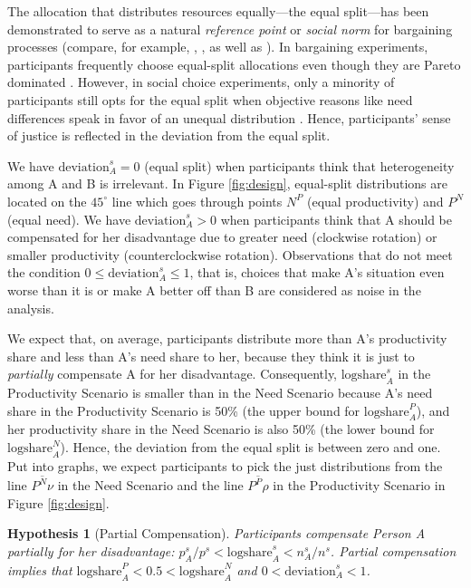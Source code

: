 \documentclass[smallcondensed]{svjour3}
\newtheorem{Hypothesis}{Hypothesis}
\begin{document}
%
The allocation that distributes resources equally---the equal split---has been demonstrated to serve as a natural \textit{reference point} or \textit{social norm} for
bargaining processes (compare, for example, \citealt{yaari_dividing_1984}, \citealt{dawid_robust_2006}, as well as \citealt{andreoni_social_2009}). In bargaining experiments, participants frequently choose equal-split allocations even though they are Pareto dominated \citep{herreiner_inequality_2010}. However, in social choice experiments, only a minority of participants still opts for the equal split when objective reasons like need differences speak in favor of an unequal distribution \citep{gaertner_empirical_2012}. Hence, participants' sense of justice is reflected in the deviation from the equal split.\par
%
We have $\mbox{deviation}_A^s=0$ (equal split) when participants think that heterogeneity among A and B is irrelevant. In Figure \ref{fig:design}, equal-split distributions are located on the $45^\circ$ line which goes through points $N^P$ (equal productivity) and $P^N$ (equal need). We have $\mbox{deviation}_A^s>0$ when participants think that A should be compensated for her disadvantage due to greater need (clockwise rotation) or smaller productivity (counterclockwise rotation). Observations that do not meet the condition $0\le\mbox{deviation}_A^s\le1$, that is, choices that make A's situation even worse than it is or make A better off than B are considered as noise in the analysis.\par
%
We expect that, on average, participants distribute more than A's productivity share and less than A's need share to her, because they think it is just to \textit{partially} compensate A for her disadvantage. Consequently, $\mbox{logshare}_A^s$ in the Productivity Scenario is smaller than in the Need Scenario because A's need share in the Productivity Scenario is 50\% (the upper bound for $\mbox{logshare}_A^P$), and her productivity share in the Need Scenario is also 50\% (the lower bound for $\mbox{logshare}_A^N$). Hence, the deviation from the equal split is between zero and one. Put into graphs, we expect participants to pick the just distributions from the line $\overline{P^N\nu}$ in the Need Scenario and the line $\overline{P^P\rho}$ in the Productivity Scenario in Figure \ref{fig:design}.
%
\begin{Hypothesis}[Partial Compensation]
Participants compensate Person A partially for her disadvantage: $p_A^s/p^s<\mbox{logshare}_A^s<n_A^s/n^s$. Partial compensation implies that
$\mbox{logshare}_A^P<0.5<\mbox{logshare}_A^N$ and $0<\mbox{deviation}_A^s<1$.
\end{Hypothesis}
\end{document}
